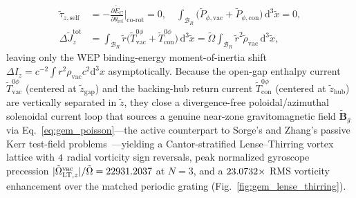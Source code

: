 \documentclass[aps,prd,twocolumn,10pt,showkeys,nofootinbib,floatfix,longbibliography]{revtex4-2}
\newcommand{\dd}{\mathrm{d}}
\begin{document}
\begin{align*}
\tilde{\tau}_{z,\mathrm{self}} &= -\frac{\partial\tilde{E}_C}{\partial\theta_{\mathrm{rel}}}\Bigg|_{\mathrm{co\text{-}rot}} = 0, \quad \int_{\mathcal{B}_R}\bigl(\tilde{P}_{\phi,\mathrm{vac}} + \tilde{P}_{\phi,\mathrm{con}}\bigr)\,\dd^3\tilde{x} = 0, \\
\Delta\tilde{J}_z^{\mathrm{tot}} &= \int_{\mathcal{B}_R}\tilde{r}\bigl(\tilde{T}^{0\phi}_{\mathrm{vac}} + \tilde{T}^{0\phi}_{\mathrm{con}}\bigr)\,\dd^3\tilde{x} = \tilde{\Omega}\int_{\mathcal{B}_R}\tilde{r}^2\tilde{\rho}_{\mathrm{vac}}\,\dd^3\tilde{x},
\end{align*}
leaving only the WEP binding-energy moment-of-inertia shift $\Delta I_z = c^{-2}\int r^2\rho_{\mathrm{vac}}c^2\dd^3x$ asymptotically. Because the open-gap enthalpy current $\tilde{T}^{0\phi}_{\mathrm{vac}}$ (centered at $\tilde{z}_{\mathrm{gap}}$) and the backing-hub return current $\tilde{T}^{0\phi}_{\mathrm{con}}$ (centered at $\tilde{z}_{\mathrm{hub}}$) are vertically separated in $\tilde{z}$, they close a divergence-free poloidal/azimuthal solenoidal current loop that sources a genuine near-zone gravitomagnetic field $\tilde{\mathbf{B}}_g$ via Eq.~\eqref{eq:gem_poisson}---the active counterpart to Sorge's and Zhang's passive Kerr test-field problems~\cite{sorge2014kerr,zhang2017plb}---yielding a Cantor-stratified Lense--Thirring vortex lattice with $4$ radial vorticity sign reversals, peak normalized gyroscope precession $|\tilde{\Omega}_{\mathrm{LT},z}^{\mathrm{vac}}|/\tilde{\Omega} = 22931.2037$ at $N=3$, and a $23.0732\times$ RMS vorticity enhancement over the matched periodic grating (Fig.~\ref{fig:gem_lense_thirring}).
\end{document}
